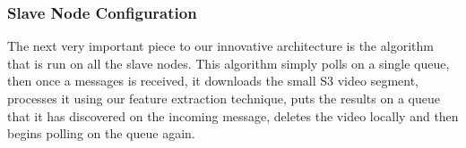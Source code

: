 \subsubsection{\label{subsubsection:slave_node}Slave Node Configuration }
The next very important piece to our innovative architecture is the algorithm
that is run on all the slave nodes. This algorithm simply polls on a single
queue, then once a messages is received, it downloads the small S3 video
segment, processes it using our feature extraction technique, puts the results
on a queue that it has discovered on the incoming message, deletes the video
locally and then begins polling on the queue again.
%
%
%


